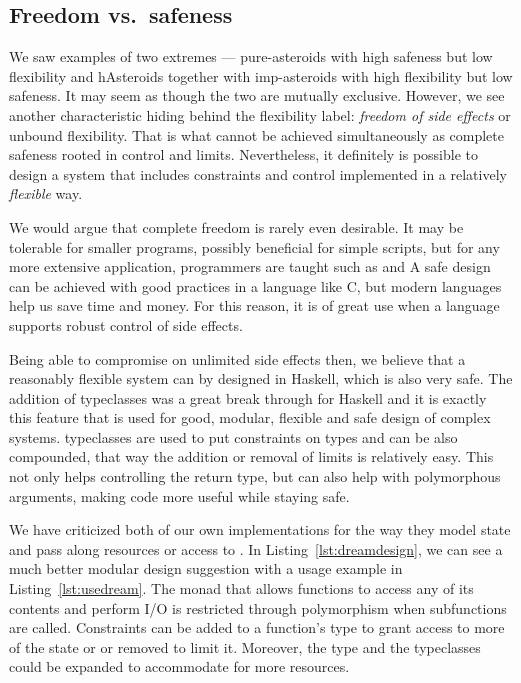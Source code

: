 \documentclass[
  digital, %
  color,   %
  table,   %
  oneside, %
  lof,     %
  lot,     %
]{fithesis3}
\newcommand{\vs}{vs.\ }
\begin{document}
{\subsection{Freedom \vs safeness}
We saw examples of two extremes --- pure-asteroids with high safeness but low flexibility
and hAsteroids together with imp-asteroids with high flexibility but low safeness.
It may seem as though the two are mutually exclusive. However, we see another
characteristic hiding behind the flexibility label: \emph{freedom of side effects}
or unbound flexibility. That is what cannot be achieved
simultaneously as complete safeness rooted in control and limits.
Nevertheless, it definitely is possible to design a system that includes
constraints and control implemented in a relatively \emph{flexible} way.

We would argue that complete freedom is rarely even desirable.
It may be tolerable for smaller programs, possibly beneficial for simple scripts,
but for any more extensive application, programmers are taught  such as
 and 
A safe design can be achieved with good practices in a language like C,
but modern languages help us save time and money.
For this reason, it is of great use when a language supports robust control
of side effects.

Being able to compromise on unlimited side effects then, we believe that a reasonably flexible
system can by designed in Haskell, which is also very safe.
The addition of typeclasses was a great break through for Haskell and it is exactly this
feature that is used for good, modular, flexible and safe design of complex systems.
typeclasses are used to put constraints on types and can be also compounded,
that way the addition or removal of limits is relatively easy.
This not only helps controlling the return type, but can also help
with polymorphous arguments, making code more useful while staying safe.

We have criticized both of our own implementations for the way they model state
and pass along resources or access to . In Listing~\ref{lst:dreamdesign},
we can see a much better modular design suggestion with a usage example in Listing~\ref{lst:usedream}.
The monad that allows functions to access any of its contents and perform I/O
is restricted through polymorphism when subfunctions are called.
Constraints can be added to a function's type to grant access to more of the state or
or removed to limit it. Moreover, the  type and the typeclasses
could be expanded to accommodate for more resources.

}
\end{document}
